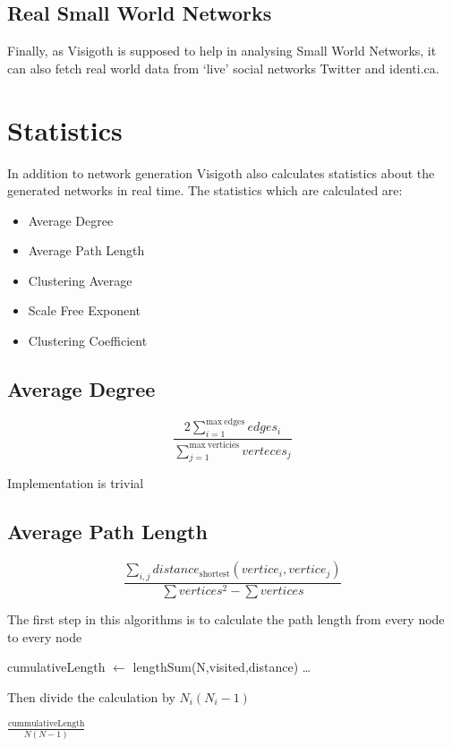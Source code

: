 \documentclass[a4paper,11pt,titlepage]{article}
\let\stdsection\section         %
\renewcommand{\section}{\newpage\stdsection}
\begin{document}
\subsection{Real Small World Networks}
Finally, as Visigoth is supposed to help in analysing Small World
Networks, it can also fetch real world data from `live' social
networks Twitter and identi.ca.

\section{Statistics}


In addition to network generation Visigoth also calculates statistics about the
generated networks in real time. The statistics which are calculated are:


\begin{itemize}
	\item Average Degree
	\item Average Path Length
	\item Clustering Average
	\item Scale Free Exponent
	\item Clustering Coefficient
\end{itemize}

\subsection{Average Degree}
\[
\frac{2\sum_{i=1}^{\mathrm{max\ edges}} edges_i}{\sum_{j=1}^{\mathrm{max\
verticies}} verteces_j}
\]

Implementation is trivial

\subsection{Average Path Length}
\[
\frac{\sum_{i,j}distance_\mathrm{shortest}(vertice_i,vertice_j)}{\sum
vertices^2 - \sum vertices}
\]

The first step in this algorithms is to calculate the path length from every
node to every node

\begin{algorithmic}
	\STATE cumulativeLength $\gets$ lengthSum(N,visited,distance)
	\STATE \dots
\ENDFOR
\end{algorithmic}
Then divide the calculation by $N_i(N_i-1)$
\begin{algorithmic}
	\RETURN  $\frac{\mathrm{cummulativeLength}}{N(N-1)}$
\end{algorithmic}
\end{document}
